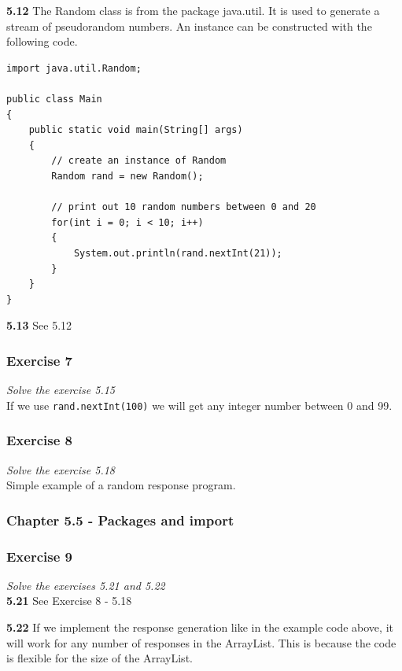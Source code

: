 \textbf{5.12} The Random class is from the package java.util. It is used to
generate a stream of pseudorandom numbers. An instance can be constructed
with the following code.

\begin{lstlisting}
import java.util.Random;

public class Main
{
	public static void main(String[] args)
	{
		// create an instance of Random
		Random rand = new Random();

		// print out 10 random numbers between 0 and 20
		for(int i = 0; i < 10; i++)
		{
			System.out.println(rand.nextInt(21));
		}
	}
}
\end{lstlisting}

\textbf{5.13} See 5.12

\subsubsection*{Exercise 7}
\textit{Solve the exercise 5.15}\\

If we use \lstinline{rand.nextInt(100)} we will get any integer number 
between 0 and 99.

\subsubsection*{Exercise 8}
\textit{Solve the exercise 5.18}\\

Simple example of a random response program.



\subsubsection{Chapter 5.5 - Packages and import}

\subsubsection*{Exercise 9}
\textit{Solve the exercises 5.21 and 5.22}\\

\textbf{5.21} See Exercise 8 - 5.18

\textbf{5.22} If we implement the response generation like in the example code 
above, it will work for any number of responses in the ArrayList. This is 
because the code is flexible for the size of the ArrayList.

